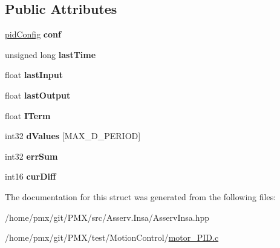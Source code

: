 \subsection*{Public Attributes}
\begin{DoxyCompactItemize}
\item 
\mbox{\label{structpidSystemValues_a1fc548635e30318af2f83d152dab8248}} 
\hyperlink{structpidConfig}{pid\+Config} {\bfseries conf}
\item 
\mbox{\label{structpidSystemValues_a9eceb99b1b5023d1377bec598d7004dc}} 
unsigned long {\bfseries last\+Time}
\item 
\mbox{\label{structpidSystemValues_a132b0bf48beb315b3f2eb0c56a38c96f}} 
float {\bfseries last\+Input}
\item 
\mbox{\label{structpidSystemValues_a8c9bd5633acdce5829785d76752f50eb}} 
float {\bfseries last\+Output}
\item 
\mbox{\label{structpidSystemValues_a0058f54532175812e1f975aaddc9ed47}} 
float {\bfseries I\+Term}
\item 
\mbox{\label{structpidSystemValues_ac73d71624b3bb0d290a60925985bc285}} 
int32 {\bfseries d\+Values} \mbox{[}M\+A\+X\+\_\+\+D\+\_\+\+P\+E\+R\+I\+OD\mbox{]}
\item 
\mbox{\label{structpidSystemValues_af30a077f04d189413198f4b770b8ea52}} 
int32 {\bfseries err\+Sum}
\item 
\mbox{\label{structpidSystemValues_a89830b7c8a8b0683da2ec04e1bacab21}} 
int16 {\bfseries cur\+Diff}
\end{DoxyCompactItemize}


The documentation for this struct was generated from the following files\+:\begin{DoxyCompactItemize}
\item 
/home/pmx/git/\+P\+M\+X/src/\+Asserv.\+Insa/Asserv\+Insa.\+hpp\item 
/home/pmx/git/\+P\+M\+X/test/\+Motion\+Control/\hyperlink{motor__PID_8c}{motor\+\_\+\+P\+I\+D.\+c}\end{DoxyCompactItemize}
